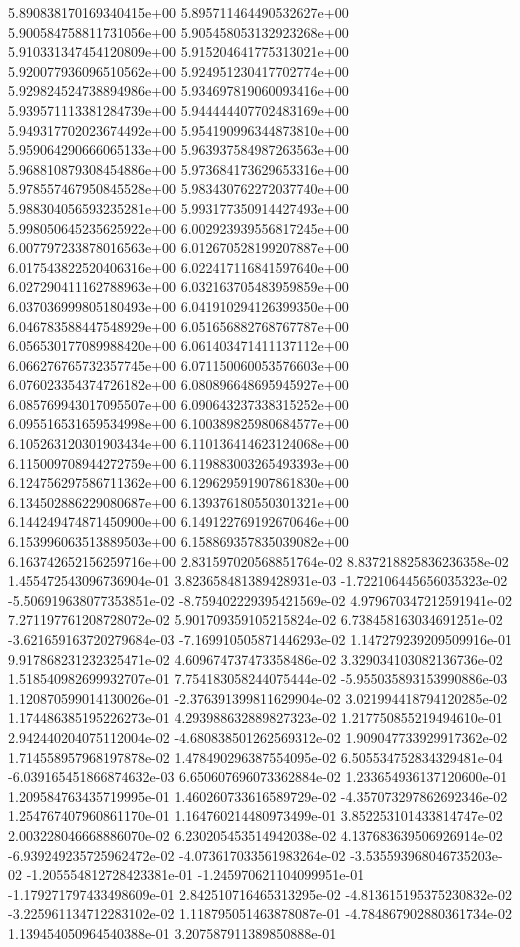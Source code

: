 5.890838170169340415e+00	5.895711464490532627e+00	5.900584758811731056e+00	5.905458053132923268e+00	5.910331347454120809e+00	5.915204641775313021e+00	5.920077936096510562e+00	5.924951230417702774e+00	5.929824524738894986e+00	5.934697819060093416e+00	5.939571113381284739e+00	5.944444407702483169e+00	5.949317702023674492e+00	5.954190996344873810e+00	5.959064290666065133e+00	5.963937584987263563e+00	5.968810879308454886e+00	5.973684173629653316e+00	5.978557467950845528e+00	5.983430762272037740e+00	5.988304056593235281e+00	5.993177350914427493e+00	5.998050645235625922e+00	6.002923939556817245e+00	6.007797233878016563e+00	6.012670528199207887e+00	6.017543822520406316e+00	6.022417116841597640e+00	6.027290411162788963e+00	6.032163705483959859e+00	6.037036999805180493e+00	6.041910294126399350e+00	6.046783588447548929e+00	6.051656882768767787e+00	6.056530177089988420e+00	6.061403471411137112e+00	6.066276765732357745e+00	6.071150060053576603e+00	6.076023354374726182e+00	6.080896648695945927e+00	6.085769943017095507e+00	6.090643237338315252e+00	6.095516531659534998e+00	6.100389825980684577e+00	6.105263120301903434e+00	6.110136414623124068e+00	6.115009708944272759e+00	6.119883003265493393e+00	6.124756297586711362e+00	6.129629591907861830e+00	6.134502886229080687e+00	6.139376180550301321e+00	6.144249474871450900e+00	6.149122769192670646e+00	6.153996063513889503e+00	6.158869357835039082e+00	6.163742652156259716e+00
2.831597020568851764e-02	8.837218825836236358e-02	1.455472543096736904e-01	3.823658481389428931e-03	-1.722106445656035323e-02	-5.506919638077353851e-02	-8.759402229395421569e-02	4.979670347212591941e-02	7.271197761208728072e-02	5.901709359105215824e-02	6.738458163034691251e-02	-3.621659163720279684e-03	-7.169910505871446293e-02	1.147279239209509916e-01	9.917868231232325471e-02	4.609674737473358486e-02	3.329034103082136736e-02	1.518540982699932707e-01	7.754183058244075444e-02	-5.955035893153990886e-03	1.120870599014130026e-01	-2.376391399811629904e-02	3.021994418794120285e-02	1.174486385195226273e-01	4.293988632889827323e-02	1.217750855219494610e-01	2.942440204075112004e-02	-4.680838501262569312e-02	1.909047733929917362e-02	1.714558957968197878e-02	1.478490296387554095e-02	6.505534752834329481e-04	-6.039165451866874632e-03	6.650607696073362884e-02	1.233654936137120600e-01	1.209584763435719995e-01	1.460260733616589729e-02	-4.357073297862692346e-02	1.254767407960861170e-01	1.164760214480973499e-01	3.852253101433814747e-02	2.003228046668886070e-02	6.230205453514942038e-02	4.137683639506926914e-02	-6.939249235725962472e-02	-4.073617033561983264e-02	-3.535593968046735203e-02	-1.205554812728423381e-01	-1.245970621104099951e-01	-1.179271797433498609e-01	2.842510716465313295e-02	-4.813615195375230832e-02	-3.225961134712283102e-02	1.118795051463878087e-01	-4.784867902880361734e-02	1.139454050964540388e-01	3.207587911389850888e-01
